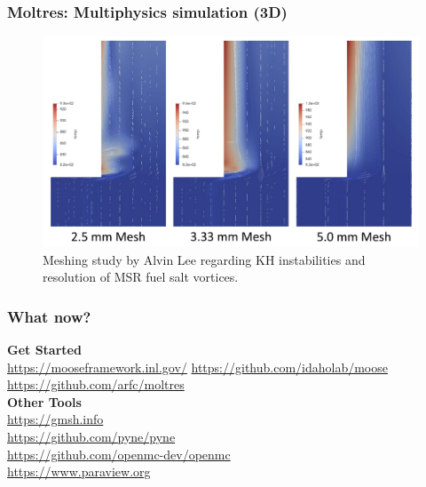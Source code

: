 \begin{frame}
  \frametitle{Moltres: Multiphysics simulation (3D)}
  \begin{figure}[t]
   \vspace{-0.1in}
   \hspace*{-0.45in}
   \includegraphics[height=0.75\textheight]{./images/lee-instability-resolution.png}
          \caption{Meshing study by Alvin Lee \cite{lee_neutronics_2020} 
          regarding KH instabilities and resolution of MSR fuel salt vortices.}
    \end{figure}

\end{frame}

\begin{frame}
        \frametitle{What now?}
        \textbf{Get Started}\\
        \href{https://mooseframework.inl.gov/}{https://mooseframework.inl.gov/}
        \href{https://github.com/idaholab/moose}{https://github.com/idaholab/moose}\\
        \href{https://github.com/arfc/moltres}{https://github.com/arfc/moltres}\\
        \textbf{Other Tools}\\
        \href{https://gmsh.info/}{https://gmsh.info}\\
        \href{https://github.com/pyne/pyne}{https://github.com/pyne/pyne}\\
        \href{https://github.com/openmc-dev/openmc}{https://github.com/openmc-dev/openmc}\\
        \href{https://www.paraview.org}{https://www.paraview.org}

\end{frame}
